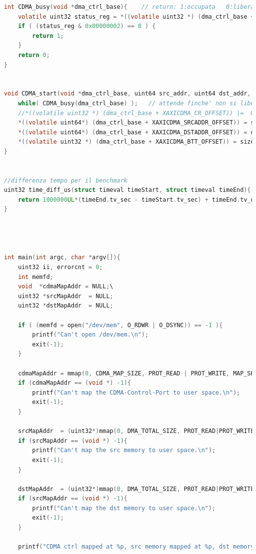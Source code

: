 \begin{lstlisting}[language=c, label=lst:sh, caption={Codice completo test CDMA}]
int CDMA_busy(void *dma_ctrl_base){    // return: 1:occupata   0:libera
    volatile uint32 status_reg = *((volatile uint32 *) (dma_ctrl_base + XAXICDMA_SR_OFFSET));
    if ( (status_reg & 0x00000002) == 0 ) {
        return 1;
    }
    return 0;
}


void CDMA_start(void *dma_ctrl_base, uint64 src_addr, uint64 dst_addr, uint32 size){
    while( CDMA_busy(dma_ctrl_base) );   // attende finche' non si libera il CDMA
    //*((volatile uint32 *) (dma_ctrl_base + XAXICDMA_CR_OFFSET)) |=  0x00007000;       // si dice al CDMA che deve accettare gli interrupt
    *((volatile uint64*) (dma_ctrl_base + XAXICDMA_SRCADDR_OFFSET)) = src_addr;     // Si imposta la sorgente
    *((volatile uint64*) (dma_ctrl_base + XAXICDMA_DSTADDR_OFFSET)) = dst_addr;     // La destinazione
    *((volatile uint32 *) (dma_ctrl_base + XAXICDMA_BTT_OFFSET)) = size;              // Si scrive un blocco della lunghezza predefinita
}


//differenza tempo per il benchmark
uint32 time_diff_us(struct timeval timeStart, struct timeval timeEnd){
    return 1000000UL*(timeEnd.tv_sec - timeStart.tv_sec) + timeEnd.tv_usec - timeStart.tv_usec;
}




int main(int argc, char *argv[]){
    uint32 ii, errorcnt = 0;
    int memfd;
    void  *cdmaMapAddr = NULL;\
    uint32 *srcMapAddr  = NULL;
    uint32 *dstMapAddr  = NULL;

    if ( (memfd = open("/dev/mem", O_RDWR | O_DSYNC)) == -1 ){
        printf("Can't open /dev/mem.\n");
        exit(-1);
    }

    cdmaMapAddr = mmap(0, CDMA_MAP_SIZE, PROT_READ | PROT_WRITE, MAP_SHARED, memfd, CDMA_BASE_ADDRESS);
    if (cdmaMapAddr == (void *) -1){
        printf("Can't map the CDMA-Control-Port to user space.\n");
        exit(-1);
    }
    
    srcMapAddr  = (uint32*)mmap(0, DMA_TOTAL_SIZE, PROT_READ|PROT_WRITE, MAP_SHARED, memfd, SRC_BASE_ADDR);
    if (srcMapAddr == (void *) -1){
        printf("Can't map the src memory to user space.\n");
        exit(-1);
    }
    
    dstMapAddr  = (uint32*)mmap(0, DMA_TOTAL_SIZE, PROT_READ|PROT_WRITE, MAP_SHARED, memfd, DST_BASE_ADDR);
    if (srcMapAddr == (void *) -1){
        printf("Can't map the dst memory to user space.\n");
        exit(-1);
    }
    
    printf("CDMA ctrl mapped at %p, src memory mapped at %p, dst memory mapped at %p\n", cdmaMapAddr, srcMapAddr, dstMapAddr);
    

\end{lstlisting}
